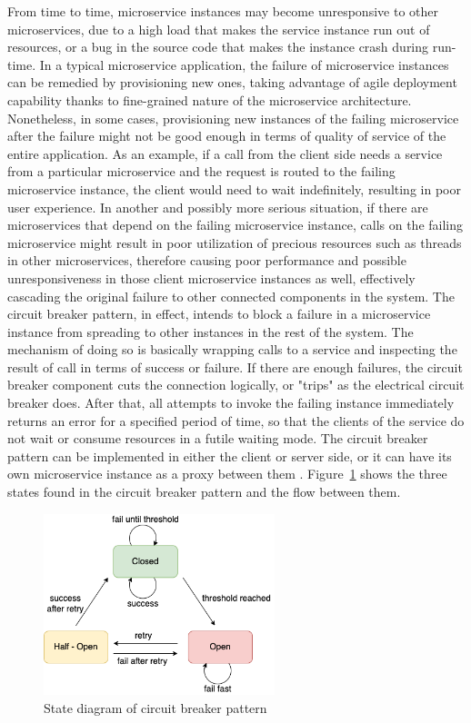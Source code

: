 \documentclass{Configuration_Files/PoliMi3i_thesis}
\begin{document}
From time to time, microservice instances may become unresponsive to other microservices, due to a high load that makes the service instance run out of resources, or a bug in the source code that makes the instance crash during run-time.
In a typical microservice application, the failure of microservice instances can be remedied by provisioning new ones, taking advantage of agile deployment capability thanks to fine-grained nature of the microservice architecture.
Nonetheless, in some cases, provisioning new instances of the failing microservice after the failure might not be good enough in terms of quality of service of the entire application.
As an example, if a call from the client side needs a service from a particular microservice and the request is routed to the failing microservice instance, the client would need to wait indefinitely, resulting in poor user experience.
In another and possibly more serious situation, if there are microservices that depend on the failing microservice instance, calls on the failing microservice might result in poor utilization of precious resources such as threads in other microservices, therefore causing poor performance and possible unresponsiveness in those client microservice instances as well, effectively cascading the original failure to other connected components in the system.
The circuit breaker pattern, in effect, intends to block a failure in a microservice instance from spreading to other instances in the rest of the system.
The mechanism of doing so is basically wrapping calls to a service and inspecting the result of call in terms of success or failure.
If there are enough failures, the circuit breaker component cuts the connection logically, or "trips" as the electrical circuit breaker does.
After that, all attempts to invoke the failing instance immediately returns an error for a specified period of time, so that the clients of the service do not wait or consume resources in a futile waiting mode.
The circuit breaker pattern can be implemented in either the client or server side, or it can have its own microservice instance as a proxy between them \cite{montesi2016circuit}.
Figure~\ref{fig:circuit_breaker} shows the three states found in the circuit breaker pattern and the flow between them.

\begin{figure}[H]
\centering
\includegraphics[width=0.60\textwidth]{myImages/circuit.png}
\caption{State diagram of circuit breaker pattern}
\label{fig:circuit_breaker}
\end{figure}
\end{document}
